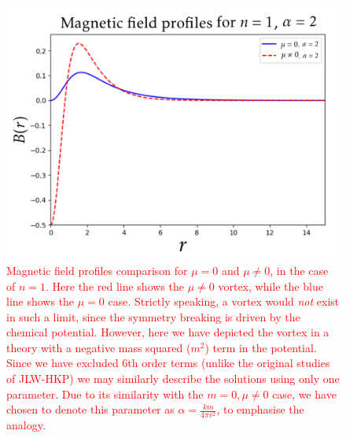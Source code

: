 \begin{figure}[H]
\begin{center}
 \includegraphics[width=5in]{Chapter_2_Folder_1912.11321/figures/solution_JLW-HKP_n-1_Bvsalpha.png}
     \caption[Magnetic field profiles comparison for $\mu =0$ and $\mu \neq 0$, in the case of $n=1$.]{ \textcolor{red}{Magnetic field profiles comparison for $\mu =0$ and $\mu \neq 0$, in the case of $n=1$. Here the red line shows the $\mu \neq 0$ vortex, while the blue line shows the $\mu =0$ case. Strictly speaking, a vortex would \textit{not} exist in such a limit, since the symmetry breaking is driven by the chemical potential. However, here we have depicted the vortex in a theory with a negative mass squared ($m^2$) term in the potential. Since we have excluded 6th order terms (unlike the original studies of JLW-HKP) we may similarly describe the solutions using only one parameter. Due to its similarity with the $m=0, \mu\neq 0$ case, we have chosen to denote this parameter as $\alpha= \frac{k m}{4\pi v^2}$, to emphasi\textcolor{red}{s}e the analogy.}} \label{Comparison}
    \end{center}
\end{figure}

